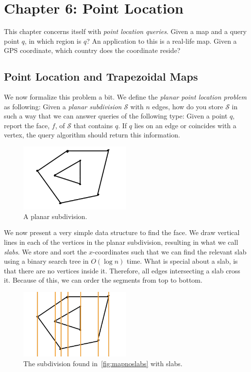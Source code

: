 \chapter{Chapter 6: Point Location}

This chapter concerns itself with \textit{point location queries}. Given a map and a query point $q$, in which region is $q$? An application to this is a real-life map. Given a GPS coordinate, which country does the coordinate reside?

\section{Point Location and Trapezoidal Maps}%
\label{subsec:label}

We now formalize this problem a bit. We define the \textit{planar point location problem} as following: Given a \textit{planar subdivision} $\mathcal{S}$ with $n$ edges, how do you store $\mathcal{S}$ in such a way that we can answer queries of the following type: Given a point $q$, report the face, $f$, of $\mathcal{S}$ that contains $q$. If $q$ lies on an edge or coincides with a vertex, the query algorithm should return this information.

\begin{figure}[ht]
	\centering
	\includegraphics[width=0.5\textwidth]{figures/Map-no-slabs.png}
	\caption{\label{fig:mapnoslabs} A planar subdivision.}
\end{figure}

We now present a very simple data structure to find the face. We draw vertical lines in each of the vertices in the planar subdivision, resulting in what we call \textit{slabs}. We store and sort the $x$-coordinates such that we can find the relevant slab using a binary search tree in $O(\log n)$ time. What is special about a slab, is that there are no vertices inside it. Therefore, all edges intersecting a slab cross it. Because of this, we can order the segments from top to bottom.

\begin{figure}[ht]
	\centering
	\includegraphics[width=0.5\textwidth]{figures/map-w-slabs.png}
	\caption{\label{fig:mapwithslabs} The subdivision found in~\autoref{fig:mapnoslabs} with slabs.}
\end{figure}



